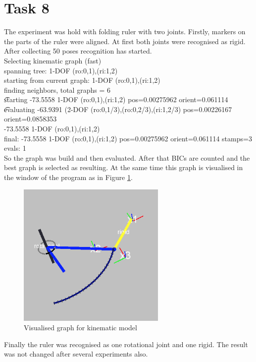 \documentclass[english]{scrartcl}
\begin{document}
\section*{Task 8}

The experiment was hold with folding ruler with two joints. Firstly, markers on the parts of the ruler were aligned. At first both joints were recognised as rigid. After collecting 50 poses recognition has started.
\\
Selecting kinematic graph (fast)
\\
spanning tree: 1-DOF (ro:0,1),(ri:1,2)
\\
starting from current graph: 1-DOF (ro:0,1),(ri:1,2)
\\
finding neighbors, total graphs = 6
\\
 \t starting   -73.5558  1-DOF (ro:0,1),(ri:1,2) pos=0.00275962 orient=0.061114
 \\
 \t evaluating -63.9391 (2-DOF (ro:0,1/3),(ro:0,2/3),(ri:1,2/3) pos=0.00226167 orient=0.0858353
\\
-73.5558  1-DOF (ro:0,1),(ri:1,2)
\\
final:  -73.5558  1-DOF (ro:0,1),(ri:1,2) pos=0.00275962 orient=0.061114 stamps=3
\\
 evals: 1
\\
So the graph was build and then evaluated. After that BICs are counted and the best graph is selected as resulting. At the same time this graph is visualised in the window of the program as in Figure \ref{fig:graph}.

\begin{figure}[h]
\centering
\includegraphics{./graph}
\caption{Visualised graph for kinematic model}
\label{fig:graph}
\end{figure}

Finally the ruler was recognised as one rotational joint and one rigid. The result was not changed after several experiments also.
\end{document}
